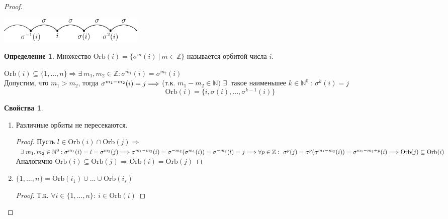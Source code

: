 \documentclass[a4paper, 12pt]{article}
\newcommand{\Z}{\mathbb Z}
\newcommand{\N}{\mathbb N}
\newcommand\tab[1][.5cm]{\hspace*{#1}}
\theoremstyle{definition}
\newtheorem*{definition}{Определение}
\newtheorem*{properties}{Свойства}
\begin{document}
\begin{proof}
\begin{itemize}
\begin{center}
      \includegraphics[width=7cm]{image/lecture-18.pdf}
    \end{center}
    \begin{definition}
      Множество $\textrm{Orb}(i) = \{\sigma^m(i) \ | \ m \in \Z\}$  называется орбитой числа $i$.
    \end{definition} 
     $\textrm{Orb}(i) \subseteq \{1,...,n\} \Longrightarrow \exists \ m_1,m_2 \in \Z: \sigma^{m_1}(i) = \sigma^{m_2}(i)$ \\
     Допустим, что $m_1 > m_2$, тогда $\sigma^{m_1 - m_2}(i)=j \\
     \Longrightarrow $ (т.к. $m_1 - m_2 \in \N)$ $\exists \ $ такое наименьшее $k \in \N^0 \ : \ \sigma^k(i)= j$ 
    $$\textrm{Orb}(i) = \{i, \sigma(i),...,\sigma^{k-1}(i)\}$$
    \begin{properties} \tab
      \begin{enumerate}
        \item Различные орбиты не пересекаются. 
        \begin{proof}
          Пусть $l \in \textrm{Orb}(i) \cap \textrm{Orb}(j) \Longrightarrow$ 
          $\exists \ m_1, m_2 \in \N^0 : 
          \sigma^{m_1}(i) = l = \sigma^{m_2}(j) \Longrightarrow 
          \sigma^{m_1-m_2}(i) = \sigma^{-m_2}(\sigma^{m_1}(i)) = \sigma^{-m_2}(l) = j \Longrightarrow \\ \forall p \in \Z: \ 
          \sigma^{p}(j)= \sigma^p(\sigma^{m_1-m_2}(i)) = \sigma^{m_1-m_2+p}(i)  \Longrightarrow \textrm{Orb}(j) \subseteq  \textrm{Orb}(i)$ \\
        Аналогично $\textrm{Orb}(i) \subseteq \textrm{Orb}(j) \Longrightarrow \textrm{Orb}(i) = \textrm{Orb}(j)$
        \end{proof} 
        \item $\{1,...,n\} = \textrm{Orb}(i_1) \cup ... \cup \textrm{Orb}(i_s)$ 
        \begin{proof}
          Т.к. $\forall i \in \{1,...,n\}: \ i \in \textrm{Orb}(i)$ 
        \end{proof} 
      \end{enumerate}
    \end{properties}

\end{itemize}
\end{proof}
\end{document}
